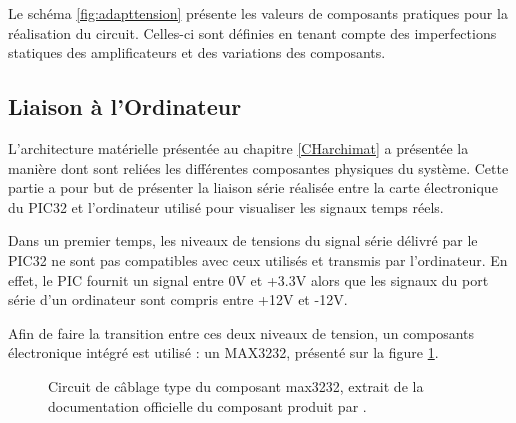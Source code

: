\documentclass[letterpaper, twoside, 12pt, memoire, creativecommons, hyperref]{thETS}
\begin{document}
Le schéma \ref{fig:adapttension} présente les valeurs de composants pratiques pour la réalisation du circuit. Celles-ci sont définies en tenant compte des imperfections statiques des amplificateurs et des variations des composants.


\subsection{Liaison à l'Ordinateur}

L'architecture matérielle présentée au chapitre \ref{CHarchimat}%
 a présentée la manière dont sont reliées les différentes composantes physiques du système. Cette partie a pour but de présenter la liaison série réalisée entre la carte électronique du PIC32 et l'ordinateur utilisé pour visualiser les signaux temps réels.

Dans un premier temps, les niveaux de tensions du signal série délivré par le PIC32 ne sont pas compatibles avec ceux utilisés et transmis par l'ordinateur. En effet, le PIC fournit un signal entre 0V et +3.3V alors que les signaux du port série d'un ordinateur sont compris entre +12V et -12V. 

Afin de faire la transition entre ces deux niveaux de tension, un composants électronique intégré est utilisé : un MAX3232, présenté sur la figure \ref{fig:max3232}.

\begin{figure}
	\centering
	\caption{Circuit de câblage type du composant max3232, extrait de la documentation officielle du composant produit par \cite{MAXIM3232}.}
	\label{fig:max3232}
\end{figure}
\end{document}
